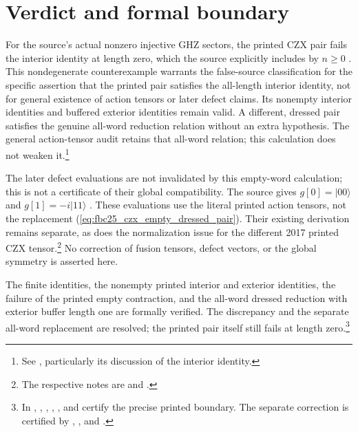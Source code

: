 \documentclass{article}
\begin{document}
\section{Verdict and formal boundary}

For the source's actual nonzero injective GHZ sectors, the printed CZX
pair fails the interior identity at length zero, which the source explicitly
includes by $n\geq0$ \cite[line~1870]{FrancoRubio2025MPUGauging}.
This nondegenerate counterexample warrants the false-source classification
for the specific assertion that the printed pair satisfies the all-length
interior identity, not for general existence of action tensors or later
defect claims. Its nonempty interior identities and buffered exterior
identities remain valid. A different, dressed pair
satisfies the genuine all-word reduction relation without an extra
hypothesis. The general action-tensor audit retains that all-word relation;
this calculation does not weaken it.\footnote{See
    ,
    particularly its discussion of the interior identity.}

The later defect evaluations are not invalidated by this empty-word
calculation; this is not a certificate of their global compatibility.
The source gives
$g[0]=|00\rangle$ and $g[1]=-i|11\rangle$
\cite[lines~4800--4859]{FrancoRubio2025MPUGauging}.
These evaluations use the literal printed action tensors, not the replacement
(\ref{eq:fbc25_czx_empty_dressed_pair}). Their existing derivation remains
separate, as does the normalization issue for the different 2017 printed
CZX tensor.\footnote{The respective notes are
     and
    .}
No correction of fusion tensors, defect vectors, or the global symmetry
is asserted here.

The finite identities, the nonempty printed interior and exterior
identities, the failure of the printed empty contraction, and the all-word
dressed reduction with exterior buffer length one are formally verified.
The discrepancy and the separate all-word replacement are resolved;
the printed pair itself still fails at length zero.\footnote{In ,
    ,
    ,
    ,
    , and
     certify the precise
    printed boundary. The separate correction is certified by
    ,
    , and
    .}



\end{document}
